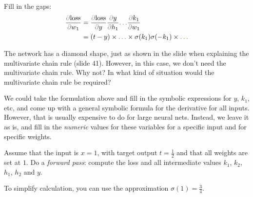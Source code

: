 \documentclass[11pt]{article}
\begin{document}
Fill in the gaps:
\begin{align}
\frac{\kp \text{loss}}{\kp w_1}
 &= \frac{\kp \text{loss}}{\kp y}\frac{\kp y}{\kp h_1} \ans{\frac{\kp h_1}{\kp k_1} }{\ldots}\frac{\kp k_1}{\kp w_1} \notag \\
 &= (t - y) \times \ans{v_1}{\ldots} \times \sigma(k_1)\sigma(-k_1) \times \ans{x}{\ldots} \label{line:chain}
\end{align}

The network has a diamond shape, just as shown in the slide when explaining the multivariate chain rule (slide 41). However, in this case, we don't need the multivariate chain rule. Why not? In what kind of situation would the multivariate chain rule be required?


We could take the formulation above and fill in the symbolic expressions for $y$, $k_1$, etc, and come up with a general symbolic formula for the derivative for all inputs. However, that is usually expensive to do for large neural nets. Instead, we leave it as is, and fill in the \emph{numeric} values for these variables for a specific input and for specific weights. 

Assume that the input is $x = 1$, with target output $t=\frac{1}{2}$ and that all weights are set at $1$. Do a \emph{forward pass}: compute the loss and all intermediate values $k_1$, $k_2$, $h_1$, $h_2$ and $y$.

To simplify calculation, you can use the approximation $\sigma(1) = \frac{3}{4}$.

\end{document}
